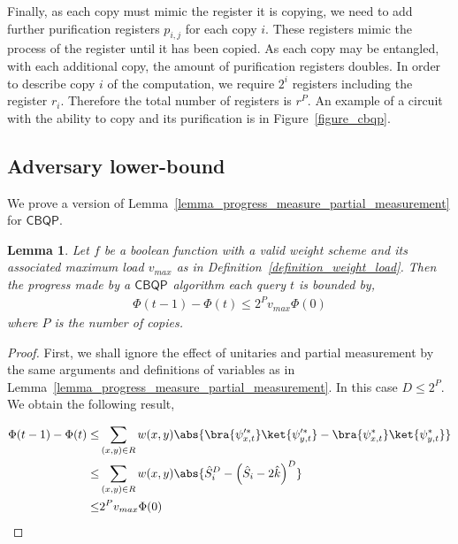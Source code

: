 \documentclass[10pt,a4paper]{article}
\newcommand{\abilityamount}[0]{\ensuremath{P}\xspace} %
\newcommand{\compclass}[2][]{\ensuremath{\mathsf{#2}^{#1}}\xspace}
\newcommand{\copybqpname}[0]{\compclass{CBQP}}
\newtheorem{lemma}[theorem]{Lemma}
\begin{document}
Finally, as each copy must mimic the register it is copying, we need to add further purification registers $p_{i,j}$ for each copy $i$. These registers mimic the process of the register until it has been copied. As each copy may be entangled, with each additional copy, the amount of purification registers doubles. In order to describe copy $i$ of the computation, we require $2^i$ registers including the register $r_i$. Therefore the total number of registers is $r^{\abilityamount}$. An example of a circuit with the ability to copy and its purification is in Figure~\ref{figure_cbqp}.

\subsection{Adversary lower-bound}

We prove a version of Lemma~\ref{lemma_progress_measure_partial_measurement} for $\mathsf{CBQP}$.

\begin{lemma}\label{lemma_copy}
    Let $f$ be a boolean function with a valid weight scheme and its associated maximum load $v_{max}$ as in Definition~\ref{definition_weight_load}. Then the progress made by a \copybqpname algorithm each query $t$ is bounded by,
    \begin{align*}
        \Phi(t-1)-\Phi(t)\leq 2^{\abilityamount} v_{max} \Phi (0)
    \end{align*}
    where \abilityamount is the number of copies.
\end{lemma}
\begin{proof}
    First, we shall ignore the effect of unitaries and partial measurement by the same arguments and definitions of variables as in Lemma~\ref{lemma_progress_measure_partial_measurement}. In this case $D\leq 2^{\abilityamount}$. We obtain the following result,

    \begin{align}
        \Phi(t-1) - \Phi(t) \leq 
        &\sum_{(x,y)\in R} w(x,y) \abs{ \bra{\psi_{x,t}^{\prime *}}\ket{\psi_{y,t}^{\prime *}} - \bra{\psi_{x,t}^*}\ket{\psi_{y,t}^*}}\label{copy_weight_1}\\
        \leq &\sum_{(x,y)\in R} w(x,y)\abs{\hat{S}_i^D - \left(\hat{S}_i - 2\hat{k}\right)^D} \label{copy_weight_2}\\
        \leq & 2^{\abilityamount}v_{max}\Phi(0)\label{copy_weight_3}
    \end{align}
\end{proof}
\end{document}
